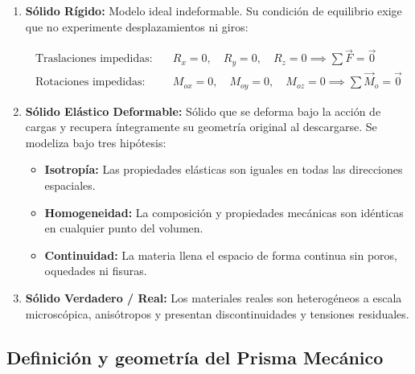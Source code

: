 \begin{enumerate}

    \item \textbf{Sólido Rígido:} Modelo ideal indeformable. Su condición de equilibrio exige que no experimente desplazamientos ni giros:

          \begin{align}

              \text{Traslaciones impedidas:} & \quad R_x = 0, \quad R_y = 0, \quad R_z = 0 \implies \sum \vec{F} = \vec{0}            \\

              \text{Rotaciones impedidas:}   & \quad M_{ox} = 0, \quad M_{oy} = 0, \quad M_{oz} = 0 \implies \sum \vec{M}_o = \vec{0}

          \end{align}

    \item \textbf{Sólido Elástico Deformable:} Sólido que se deforma bajo la acción de cargas y recupera íntegramente su geometría original al descargarse. Se modeliza bajo tres hipótesis:

          \begin{itemize}

              \item \textbf{Isotropía:} Las propiedades elásticas son iguales en todas las direcciones espaciales.

              \item \textbf{Homogeneidad:} La composición y propiedades mecánicas son idénticas en cualquier punto del volumen.

              \item \textbf{Continuidad:} La materia llena el espacio de forma continua sin poros, oquedades ni fisuras.

          \end{itemize}

    \item \textbf{Sólido Verdadero / Real:} Los materiales reales son heterogéneos a escala microscópica, anisótropos y presentan discontinuidades y tensiones residuales.

\end{enumerate}



\subsection{Definición y geometría del Prisma Mecánico}



